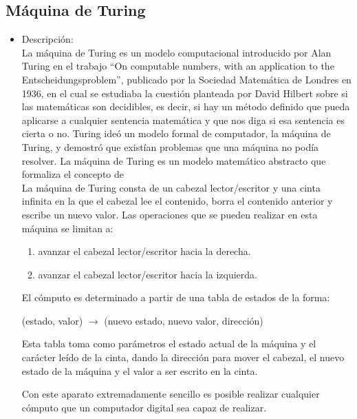 \documentclass[12pt,a4paper,spanish]{book}
\begin{document}
\subsection{M\'aquina de Turing}
\begin{itemize}
\item Descripci\'on:\\
\newline
La m\'aquina de Turing es un modelo computacional introducido por Alan Turing en el trabajo ``On computable numbers, with an application to the Entscheidungsproblem'', publicado por la Sociedad Matem\'atica de Londres en 1936, en el cual se estudiaba la cuesti\'on planteada por David Hilbert sobre si las matem\'aticas son decidibles, es decir, si hay un m\'etodo definido que pueda aplicarse a cualquier sentencia matem\'atica y que nos diga si esa sentencia es cierta o no. Turing ide\'o un modelo formal de computador, la m\'aquina de Turing, y demostr\'o que exist\'ian problemas que una m\'aquina no pod\'ia resolver. La m\'aquina de Turing es un modelo matem\'atico abstracto que formaliza el concepto de \\
\newpage
La m\'aquina de Turing consta de un cabezal lector/escritor y una cinta infinita en la que el cabezal lee el contenido, borra el contenido anterior y escribe un nuevo valor. Las operaciones que se pueden realizar en esta m\'aquina se limitan a:
\begin{center}
\begin{enumerate}
\item avanzar el cabezal lector/escritor hacia la derecha.
\item avanzar el cabezal lector/escritor hacia la izquierda.
\end{enumerate}
\end{center}
El c\'omputo es determinado a partir de una tabla de estados de la forma:
\begin{center}
(estado, valor) $\rightarrow$ (nuevo estado, nuevo valor, direcci\'on)\\
\end{center}
Esta tabla toma como par\'ametros el estado actual de la m\'aquina y el car\'acter le\'ido de la cinta, dando la direcci\'on para mover el cabezal, el nuevo estado de la m\'aquina y el valor a ser escrito en la cinta.

Con este aparato extremadamente sencillo es posible realizar cualquier c\'omputo que un computador digital sea capaz de realizar.


\end{itemize}
\end{document}
